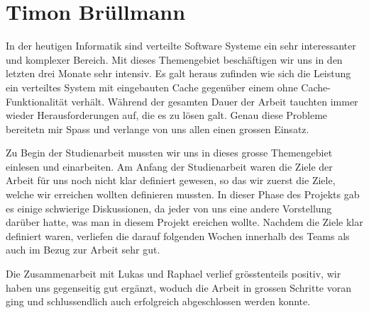 \section{Timon Brüllmann}

In der heutigen Informatik sind verteilte Software Systeme ein sehr interessanter und komplexer Bereich. Mit dieses Themengebiet beschäftigen wir uns in den letzten drei Monate sehr intensiv. Es galt heraus zufinden wie sich die Leistung ein verteiltes System mit eingebauten Cache gegenüber einem ohne Cache-Funktionalität verhält. Während der gesamten Dauer der Arbeit tauchten immer wieder Herausforderungen auf, die es zu lösen galt. Genau diese Probleme bereitetn mir Spass und verlange von uns allen einen grossen Einsatz.


Zu Begin der Studienarbeit mussten wir uns in dieses grosse Themengebiet einlesen und einarbeiten. Am Anfang der Studienarbeit waren die Ziele der Arbeit für uns noch nicht klar definiert gewesen, so das wir zuerst die Ziele, welche wir erreichen wollten definieren mussten. In dieser Phase des Projekts gab es einige schwierige Diskussionen, da jeder von uns eine andere Vorstellung darüber hatte, was man in diesem Projekt ereichen wollte. Nachdem die Ziele klar definiert waren, verliefen die darauf folgenden Wochen innerhalb des Teams als auch im Bezug zur Arbeit sehr gut.  


Die Zusammenarbeit mit Lukas und Raphael verlief grösstenteils positiv, wir haben uns gegenseitig gut ergänzt, woduch die Arbeit in grossen Schritte voran ging und schlussendlich auch erfolgreich abgeschlossen werden konnte.


